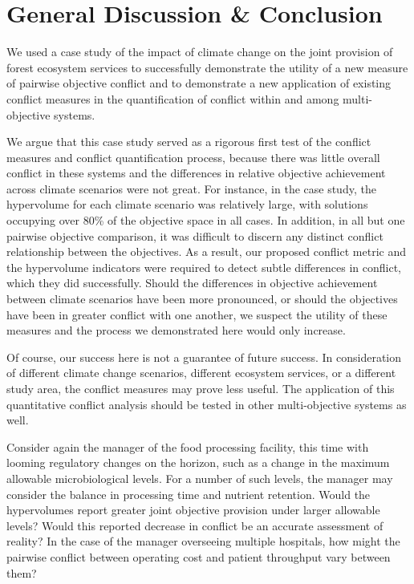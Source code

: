 \section{General Discussion \& Conclusion}
We used a case study of the impact of climate change on the joint provision of forest ecosystem services to successfully demonstrate the utility of a new measure of pairwise objective conflict and to demonstrate a new application of existing conflict measures in the quantification of conflict within and among multi-objective systems.

We argue that this case study served as a rigorous first test of the conflict measures and conflict quantification process, because there was little overall conflict in these systems and the differences in relative objective achievement across climate scenarios were not great. For instance, in the case study, the hypervolume for each climate scenario was relatively large, with solutions occupying over 80\% of the objective space in all cases. In addition, in all but one pairwise objective comparison, it was difficult to discern any distinct conflict relationship between the objectives. As a result, our proposed conflict metric and the hypervolume indicators were required to detect subtle differences in conflict, which they did successfully. Should the differences in objective achievement between climate scenarios have been more pronounced, or should the objectives have been in greater conflict with one another, we suspect the utility of these measures and the process we demonstrated here would only increase.

Of course, our success here is not a guarantee of future success. In consideration of different climate change scenarios, different ecosystem services, or a different study area, the conflict measures may prove less useful. The application of this quantitative conflict analysis should be tested in other multi-objective systems as well.

Consider again the manager of the food processing facility, this time with looming regulatory changes on the horizon, such as a change in the maximum allowable microbiological levels. For a number of such levels, the manager may consider the balance in processing time and nutrient retention. Would the hypervolumes report greater joint objective provision under larger allowable levels? Would this reported decrease in conflict be an accurate assessment of reality? In the case of the manager overseeing multiple hospitals, how might the pairwise conflict between operating cost and patient throughput vary between them?

